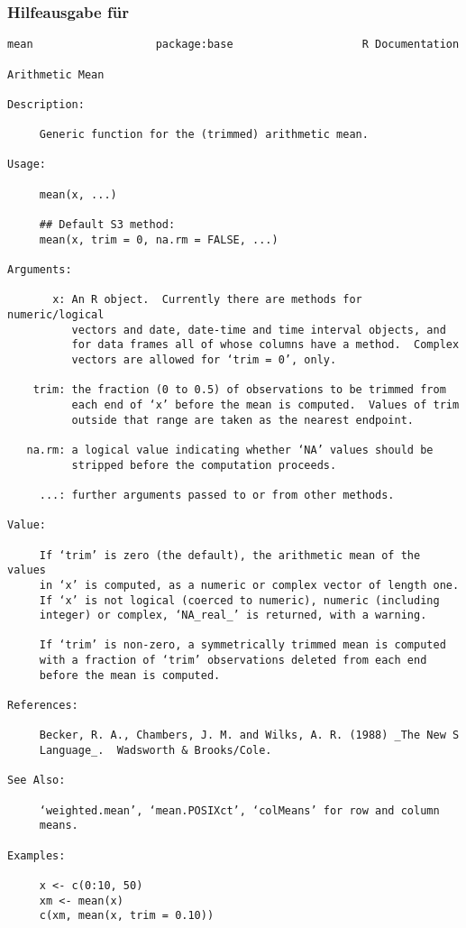 \begin{frame}[plain, fragile, shrink=10]\frametitle{Hilfeausgabe für }

\begin{tiny}
\begin{verbatim}
mean                   package:base                    R Documentation

Arithmetic Mean

Description:

     Generic function for the (trimmed) arithmetic mean.

Usage:

     mean(x, ...)

     ## Default S3 method:
     mean(x, trim = 0, na.rm = FALSE, ...)

Arguments:

       x: An R object.  Currently there are methods for numeric/logical
          vectors and date, date-time and time interval objects, and
          for data frames all of whose columns have a method.  Complex
          vectors are allowed for ‘trim = 0’, only.

    trim: the fraction (0 to 0.5) of observations to be trimmed from
          each end of ‘x’ before the mean is computed.  Values of trim
          outside that range are taken as the nearest endpoint.

   na.rm: a logical value indicating whether ‘NA’ values should be
          stripped before the computation proceeds.

     ...: further arguments passed to or from other methods.

Value:

     If ‘trim’ is zero (the default), the arithmetic mean of the values
     in ‘x’ is computed, as a numeric or complex vector of length one.
     If ‘x’ is not logical (coerced to numeric), numeric (including
     integer) or complex, ‘NA_real_’ is returned, with a warning.

     If ‘trim’ is non-zero, a symmetrically trimmed mean is computed
     with a fraction of ‘trim’ observations deleted from each end
     before the mean is computed.

References:

     Becker, R. A., Chambers, J. M. and Wilks, A. R. (1988) _The New S
     Language_.  Wadsworth & Brooks/Cole.

See Also:

     ‘weighted.mean’, ‘mean.POSIXct’, ‘colMeans’ for row and column
     means.

Examples:

     x <- c(0:10, 50)
     xm <- mean(x)
     c(xm, mean(x, trim = 0.10))
\end{verbatim}
\end{tiny}
\end{frame}



